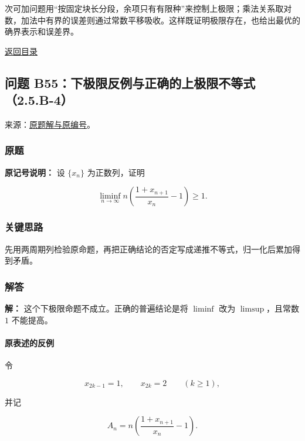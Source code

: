 \documentclass[11pt,a4paper]{article}
\begin{document}
次可加问题用``按固定块长分段，余项只有有限种''来控制上极限；乘法关系取对数，加法中有界的误差则通过常数平移吸收。这样既证明极限存在，也给出最优的确界表示和误差界。

\noindent\hyperref[contents]{返回目录}

\subsection{问题
B55：下极限反例与正确的上极限不等式（2.5.B-4）}\label{ux95eeux9898-b55ux4e0bux6781ux9650ux53cdux4f8bux4e0eux6b63ux786eux7684ux4e0aux6781ux9650ux4e0dux7b49ux5f0f2.5.b-4}

来源：\href{https://zj139.github.io/math-notes/problems/6e82c6e274a8f219f40720c7/\#问题-b55}{原题解与原编号}。

\subsubsection{原题}\label{ux539fux9898-23}

\textbf{原记号说明：} 设 \(\{x_n\}\) 为正数列，证明

\[
\liminf_{n\to\infty}
n\left(\frac{1+x_{n+1}}{x_n}-1\right)\ge1.
\]

\subsubsection{关键思路}\label{ux5173ux952eux601dux8def-23}

先用两周期列检验原命题，再把正确结论的否定写成递推不等式，归一化后累加得到矛盾。

\subsubsection{解答}\label{ux89e3ux7b54-23}

\textbf{解：} 这个下极限命题不成立。正确的普遍结论是将 \(\liminf\) 改为
\(\limsup\)，且常数 \(1\) 不能提高。

\paragraph{原表述的反例}\label{ux539fux8868ux8ff0ux7684ux53cdux4f8b}

令

\[
x_{2k-1}=1,\qquad x_{2k}=2\qquad(k\ge1),
\]

并记

\[
A_n=n\left(\frac{1+x_{n+1}}{x_n}-1\right).
\]
\end{document}
